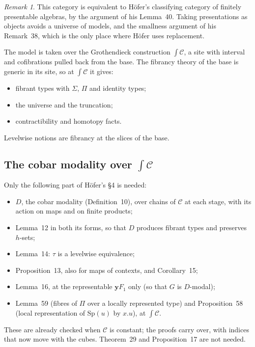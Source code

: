 \documentclass[11pt]{amsart}
\theoremstyle{definition}
\theoremstyle{remark}
\newtheorem{remark}[theorem]{Remark}
\newcommand{\Sp}{\mathrm{Sp}}
\newcommand{\yo}{\mathbf{y}}
\newcommand{\tC}{{\textstyle\int}\mathcal C}
\begin{document}
\begin{remark}\label{rem:site}
This category is equivalent to H\"ofer's classifying category of finitely
presentable algebras, by the argument of his Lemma~40. Taking
presentations as objects avoids a universe of models, and the smallness
argument of his Remark~38, which is the only place where H\"ofer uses
replacement.
\end{remark}

The model is taken over the Grothendieck construction $\tC$, a site
with interval and cofibrations pulled back from the base. The fibrancy
theory of the base is generic in its site, so at $\tC$ it gives:
\begin{itemize}
\item fibrant types with $\Sigma$, $\Pi$ and identity types;
\item the universe and the truncation;
\item contractibility and homotopy facts.
\end{itemize}
Levelwise notions are fibrancy at the slices of the base.

\subsection{The cobar modality over $\tC$}
Only the following part of H\"ofer's \S4 is needed:
\begin{itemize}
\item $D$, the cobar modality (Definition~10), over chains of $\mathcal C$
at each stage, with its action on maps and on finite products;
\item Lemma~12 in both its forms, so that $D$ produces fibrant types and
preserves $h$-sets;
\item Lemma~14: $\tau$ is a levelwise equivalence;
\item Proposition~13, also for maps of contexts, and Corollary~15;
\item Lemma~16, at the representable $\yo F_1$ only (so that $G$ is
$D$-modal);
\item Lemma~59 (fibres of $\Pi$ over a locally represented type) and
Proposition~58 (local representation of $\Sp(u)$ by $x.u$), at $\tC$.
\end{itemize}
These are already checked when $\mathcal C$ is constant; the proofs carry
over, with indices that now move with the cubes. Theorem~29 and
Proposition~17 are not needed.
\end{document}
